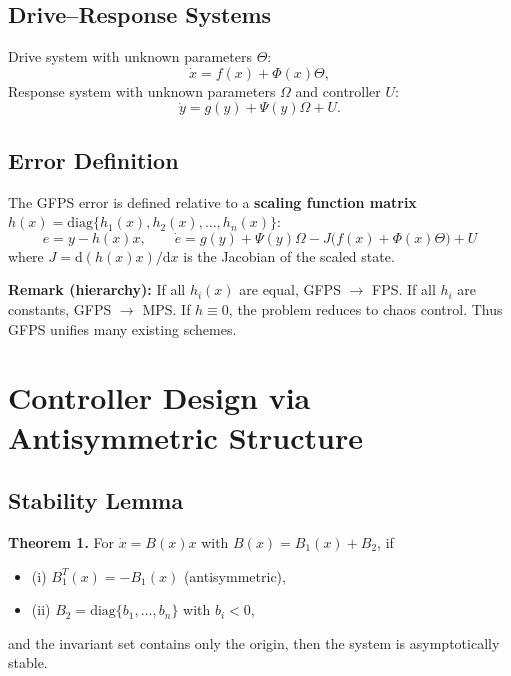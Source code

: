 \documentclass[11pt,a4paper]{article}
\begin{document}
\subsection{Drive--Response Systems}

Drive system with unknown parameters $\Theta$:
\begin{equation}
\dot{x} = f(x) + \Phi(x)\Theta,
\label{eq:drive}
\end{equation}
Response system with unknown parameters $\Omega$ and controller $U$:
\begin{equation}
\dot{y} = g(y) + \Psi(y)\Omega + U.
\label{eq:response}
\end{equation}

\subsection{Error Definition}

The GFPS error is defined relative to a \textbf{scaling function matrix} $h(x) = \mathrm{diag}\{h_1(x), h_2(x), \ldots, h_n(x)\}$:
\begin{equation}
\boxed{e = y - h(x)x, \qquad \dot{e} = g(y) + \Psi(y)\Omega - J\big(f(x) + \Phi(x)\Theta\big) + U}
\label{eq:error}
\end{equation}
where $J = \mathrm{d}(h(x)x)/\mathrm{d}x$ is the Jacobian of the scaled state.

\textbf{Remark (hierarchy):} If all $h_i(x)$ are equal, GFPS $\to$ FPS. If all $h_i$ are constants, GFPS $\to$ MPS. If $h \equiv 0$, the problem reduces to chaos control. Thus GFPS unifies many existing schemes.

\section{Controller Design via Antisymmetric Structure}

\subsection{Stability Lemma}

\textbf{Theorem 1.} For $\dot{x} = B(x)x$ with $B(x) = B_1(x) + B_2$, if
\begin{itemize}[leftmargin=2em]
\item (i) $B_1^T(x) = -B_1(x)$ (antisymmetric),
\item (ii) $B_2 = \mathrm{diag}\{b_1,\ldots,b_n\}$ with $b_i < 0$,
\end{itemize}
and the invariant set contains only the origin, then the system is asymptotically stable.
\end{document}
